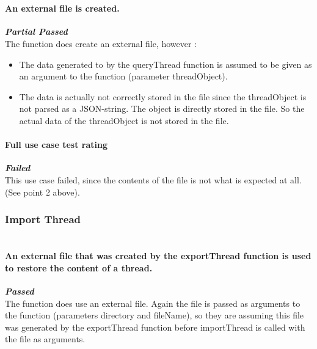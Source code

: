 \paragraph{\color{black}\\An external file is created.\\}
\color{myOrange}
\textbf{\small \emph{Partial Passed}} \\
\color{black}The function does create an external file, however :
	\begin{itemize}
	\item{The data generated to by the queryThread function is assumed to be given as an argument to the function  (parameter threadObject).}
	\item{The data is actually not correctly stored in the file since the threadObject is not parsed as a JSON-string. The object is directly stored in the file. So the actual data of the threadObject is not stored in the file.}
	\end{itemize}
\par

\paragraph{\color{black} Full use case test rating\\}
\color{red}
\textbf{\small \emph{Failed}} \\
\color{black}
This use case failed, since the contents of the file is not what is expected at all. (See point 2 above).
\par

\subsubsection{Import Thread}
\paragraph{\color{black}\\An external file that was created by the exportThread function is used to restore the content of a thread.\\}
\color{green}
\textbf{\small \emph{Passed}} \\
\color{black}The function does use an external file. Again the file is passed as arguments to the function (parameters directory and fileName), so they are assuming this file was generated by the exportThread function before importThread is called with the file as arguments.
\par


